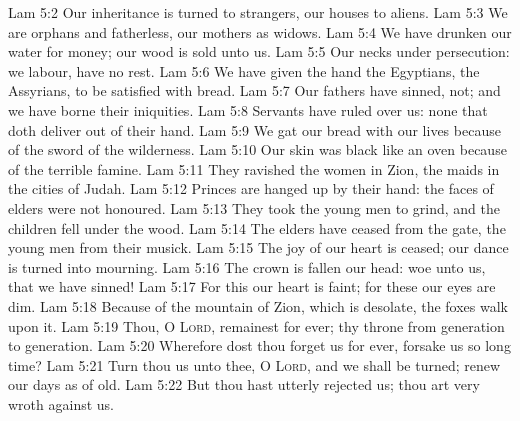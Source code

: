 \vs Lam 5:2 Our inheritance is turned to strangers, our houses to aliens.
\vs Lam 5:3 We are orphans and fatherless, our mothers  as widows.
\vs Lam 5:4 We have drunken our water for money; our wood is sold unto us.
\vs Lam 5:5 Our necks  under persecution: we labour,  have no rest.
\vs Lam 5:6 We have given the hand  the Egyptians,  the Assyrians, to be satisfied with bread.
\vs Lam 5:7 Our fathers have sinned,  not; and we have borne their iniquities.
\vs Lam 5:8 Servants have ruled over us:  none that doth deliver  out of their hand.
\vs Lam 5:9 We gat our bread with  our lives because of the sword of the wilderness.
\vs Lam 5:10 Our skin was black like an oven because of the terrible famine.
\vs Lam 5:11 They ravished the women in Zion,  the maids in the cities of Judah.
\vs Lam 5:12 Princes are hanged up by their hand: the faces of elders were not honoured.
\vs Lam 5:13 They took the young men to grind, and the children fell under the wood.
\vs Lam 5:14 The elders have ceased from the gate, the young men from their musick.
\vs Lam 5:15 The joy of our heart is ceased; our dance is turned into mourning.
\vs Lam 5:16 The crown is fallen  our head: woe unto us, that we have sinned!
\vs Lam 5:17 For this our heart is faint; for these  our eyes are dim.
\vs Lam 5:18 Because of the mountain of Zion, which is desolate, the foxes walk upon it.
\vs Lam 5:19 Thou, O \textsc{Lord}, remainest for ever; thy throne from generation to generation.
\vs Lam 5:20 Wherefore dost thou forget us for ever,  forsake us so long time?
\vs Lam 5:21 Turn thou us unto thee, O \textsc{Lord}, and we shall be turned; renew our days as of old.
\vs Lam 5:22 But thou hast utterly rejected us; thou art very wroth against us.
